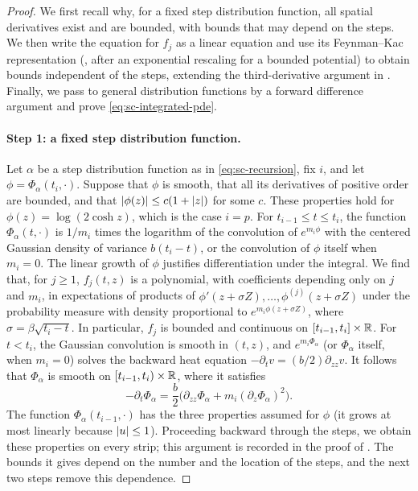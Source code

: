 \begin{proof}
We first recall why, for a fixed step distribution function, all spatial
derivatives exist and are bounded, with bounds that may depend on the steps.
We then write the equation for $f_j$ as a linear equation and use its
Feynman--Kac representation (\cite[Theorem~5.7.6]{karatzas-shreve-1991}, after
an exponential rescaling for a bounded potential) to obtain bounds independent
of the steps, extending the third-derivative argument in
\cite[proof of Lemma~3.1]{oai-barriers}.
Finally, we pass to general distribution functions by a forward difference
argument and prove \eqref{eq:sc-integrated-pde}.

\paragraph{Step 1: a fixed step distribution function.}
Let $\alpha$ be a step distribution function as in \eqref{eq:sc-recursion},
fix $i$, and let $\phi=\Phi_\alpha(t_i,\cdot)$. Suppose that $\phi$ is
smooth, that all its derivatives of positive order are bounded, and that
$\lvert \phi(z)\rvert\le c(1+\lvert z\rvert)$ for some $c$. These properties hold for
$\phi(z)=\log(2\cosh z)$, which is the case $i=p$. For
$t_{i-1}\le t\le t_i$, the function $\Phi_\alpha(t,\cdot)$ is $1/m_i$ times
the logarithm of the convolution of $e^{m_i\phi}$ with the centered Gaussian
density of variance $b(t_i-t)$, or the convolution of $\phi$ itself when
$m_i=0$. The linear growth of $\phi$ justifies differentiation under the
integral. We find that, for $j\ge1$, $f_j(t,z)$ is a polynomial, with
coefficients depending only on $j$ and $m_i$, in expectations of products of
$\phi'(z+\sigma Z),\dots,\phi^{(j)}(z+\sigma Z)$ under the probability
measure with density proportional to $e^{m_i\phi(z+\sigma Z)}$, where
$\sigma=\beta\sqrt{t_i-t}$. In particular, $f_j$ is bounded and
continuous on $[t_{i-1},t_i]\times\mathbb R$. For $t<t_i$, the Gaussian
convolution is smooth in $(t,z)$, and $e^{m_i\Phi_\alpha}$ (or
$\Phi_\alpha$ itself, when $m_i=0$) solves the backward heat equation
$-\partial_tv=(b/2)\partial_{zz}v$. It follows that
$\Phi_\alpha$ is smooth on $[t_{i-1},t_i)\times\mathbb R$, where it satisfies
\[
 -\partial_t\Phi_\alpha=\frac b2\bigl(\partial_{zz}\Phi_\alpha
   +m_i(\partial_z\Phi_\alpha)^2\bigr).
\]
The function $\Phi_\alpha(t_{i-1},\cdot)$ has the three properties assumed for
$\phi$ (it grows at most linearly because $\lvert u\rvert\le1$). Proceeding backward
through the steps, we obtain these properties on every strip; this argument
is recorded in the proof of \cite[Lemma~3.1]{oai-barriers}. The bounds it gives depend on the number and
the location of the steps, and the next two steps remove this dependence.


\end{proof}
